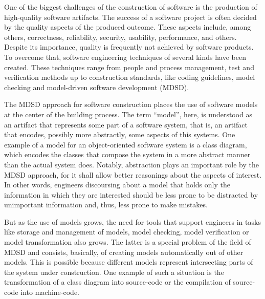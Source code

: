 One of the biggest challenges of the construction of software is the production of high-quality software artifacts. The success of a software project is often decided by the quality aspects of the produced outcome. These aspects include, among others, correctness, reliability, security, usability, performance, and others. Despite its importance, quality is frequently not achieved by software products. To overcome that, software engineering techniques of several kinds have been created. These techniques range from people and process management, test and verification methods up to construction standards, like coding guidelines, model checking and model-driven software development (MDSD).

The MDSD approach for software construction places the use of software models at the center of the building process. The term ``model'', here, is understood as an artifact that represents some part of a software system, that is, an artifact that encodes, possibly more abstractly, some aspects of this systems. One example of a model for an object-oriented software system is a class diagram, which encodes the classes that compose the system in a more abstract manner than the actual system does. Notably, abstraction plays an important role by the MDSD approach, for it shall allow better reasonings about the aspects of interest. In other words, engineers discoursing about a model that holds only the information in which they are interested should be less prone to be distracted by unimportant information and, thus, less prone to make mistakes.

But as the use of models grows, the need for tools that support engineers in tasks like storage and management of models, model checking, model verification or model transformation also grows. The latter is a special problem of the field of MDSD and consists, basically, of creating models automatically out of other models. This is possible because different models represent intersecting parts of the system under construction. One example of such a situation is the transformation of a class diagram into source-code or the compilation of source-code into machine-code.

